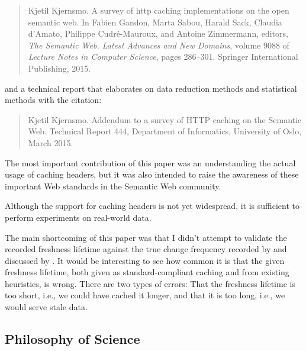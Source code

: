 \begin{quote}
Kjetil Kjernsmo.
\newblock A survey of http caching implementations on the open semantic web.
\newblock In Fabien Gandon, Marta Sabou, Harald Sack, Claudia d’Amato,
  Philippe Cudré-Mauroux, and Antoine Zimmermann, editors, {\em The Semantic
  Web. Latest Advances and New Domains}, volume 9088 of {\em Lecture Notes in
  Computer Science}, pages 286--301. Springer International Publishing, 2015.
\end{quote}

and a technical report that elaborates on data reduction
methods and statistical methods with the citation:

\begin{quote}
Kjetil Kjernsmo.
\newblock Addendum to a survey of {HTTP} caching on the {Semantic Web}.
\newblock Technical Report 444, Department of Informatics, University of Oslo,
  March 2015.
\end{quote}

The most important contribution of this paper was an understanding the
actual usage of caching headers, but it was also intended to raise the
awareness of these important Web standards in the Semantic Web community.

Although the support for caching headers is not yet widespread, it is
sufficient to perform experiments on real-world data.

The main shortcoming of this paper was that I didn't attempt to
validate the recorded freshness lifetime against the true change
frequency recorded by \cite{dyldo2} and discussed by
\cite{Dividino2015}. It would be interesting to see how common it is
that the given freshness lifetime, both given as standard-compliant
caching and from existing heuristics, is wrong. There are two types of
errors: That the freshness lifetime is too short, i.e., we could have
cached it longer, and that it is too long, i.e., we would serve stale
data.

\subsection{Philosophy of Science}\label{sec:conphil}

